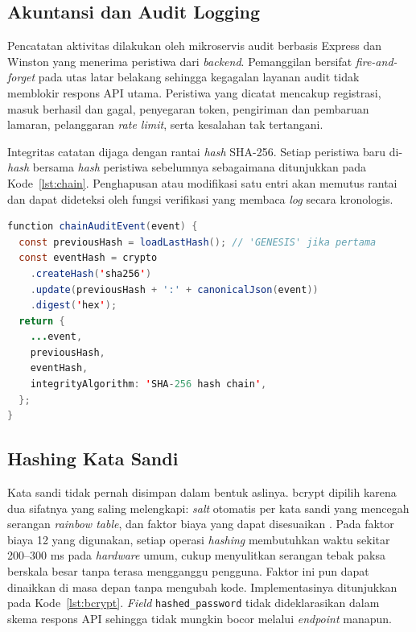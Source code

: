 \documentclass[12pt,a4paper]{article}
\begin{document}
\subsection{Akuntansi dan Audit Logging}

Pencatatan aktivitas dilakukan oleh mikroservis audit berbasis Express
dan Winston yang menerima peristiwa dari \textit{backend}. Pemanggilan
bersifat \textit{fire-and-forget} pada utas latar belakang sehingga
kegagalan layanan audit tidak memblokir respons API utama. Peristiwa
yang dicatat mencakup registrasi, masuk berhasil dan gagal, penyegaran
token, pengiriman dan pembaruan lamaran, pelanggaran \textit{rate
limit}, serta kesalahan tak tertangani.

Integritas catatan dijaga dengan rantai \textit{hash} SHA-256. Setiap
peristiwa baru di-\textit{hash} bersama \textit{hash} peristiwa
sebelumnya sebagaimana ditunjukkan pada Kode~\ref{lst:chain}.
Penghapusan atau modifikasi satu entri akan memutus rantai dan dapat
dideteksi oleh fungsi verifikasi yang membaca \textit{log} secara
kronologis.

\begin{lstlisting}[language=Java,
  caption={Perantaian hash SHA-256 pada tiap entri audit;
           modifikasi satu entri memutus rantai},
  label={lst:chain}]
function chainAuditEvent(event) {
  const previousHash = loadLastHash(); // 'GENESIS' jika pertama
  const eventHash = crypto
    .createHash('sha256')
    .update(previousHash + ':' + canonicalJson(event))
    .digest('hex');
  return {
    ...event,
    previousHash,
    eventHash,
    integrityAlgorithm: 'SHA-256 hash chain',
  };
}
\end{lstlisting}

\subsection{Hashing Kata Sandi}

Kata sandi tidak pernah disimpan dalam bentuk aslinya. bcrypt dipilih
karena dua sifatnya yang saling melengkapi: \textit{salt} otomatis per
kata sandi yang mencegah serangan \textit{rainbow table}, dan faktor
biaya yang dapat disesuaikan \citep{Provos1999}. Pada faktor biaya 12
yang digunakan, setiap operasi \textit{hashing} membutuhkan waktu
sekitar 200--300 ms pada \textit{hardware} umum, cukup menyulitkan
serangan tebak paksa berskala besar tanpa terasa mengganggu pengguna.
Faktor ini pun dapat dinaikkan di masa depan tanpa mengubah kode.
Implementasinya ditunjukkan pada Kode~\ref{lst:bcrypt}. \textit{Field}
\texttt{hashed\_password} tidak dideklarasikan dalam skema respons API
sehingga tidak mungkin bocor melalui \textit{endpoint} manapun.
\end{document}
